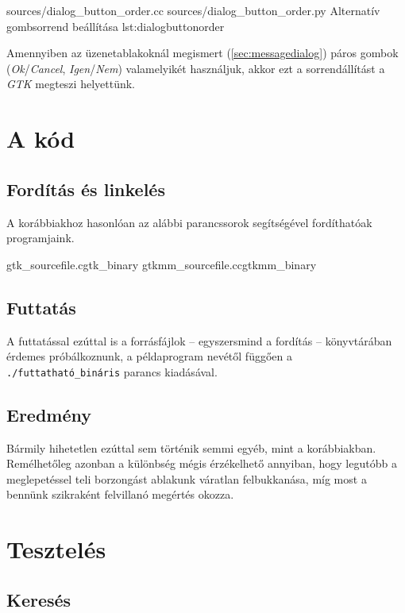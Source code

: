 {sources/dialog_button_order.cc}
{sources/dialog_button_order.py}
{Alternatív gombsorrend beállítása}
{lst:dialogbuttonorder}

Amennyiben az üzenetablakoknál megismert (\ref{sec:messagedialog}) páros gombok (\textit{Ok}/\textit{Cancel}, \textit{Igen}/\textit{Nem}) valamelyikét használjuk, akkor ezt a sorrendállítást a \textit{GTK} megteszi helyettünk.

\section{A kód}

\subsection{Fordítás és linkelés}

A korábbiakhoz hasonlóan az alábbi parancssorok segítségével fordíthatóak programjaink.

\lstcompiles
{gtk_sourcefile.c}{gtk_binary}
{gtkmm_sourcefile.cc}{gtkmm_binary}

\subsection{Futtatás}

A futtatással ezúttal is a forrásfájlok -- egyszersmind a fordítás -- könyvtárában érdemes próbálkoznunk, a példaprogram nevétől függően a \texttt{./futtatható\_bináris} parancs kiadásával.

\subsection{Eredmény}

Bármily hihetetlen ezúttal sem történik semmi egyéb, mint a korábbiakban. Remélhetőleg azonban a különbség mégis érzékelhető annyiban, hogy legutóbb a meglepetéssel teli borzongást ablakunk váratlan felbukkanása, míg most a bennünk szikraként felvillanó megértés okozza.

\section{Tesztelés}

\subsection{Keresés}

